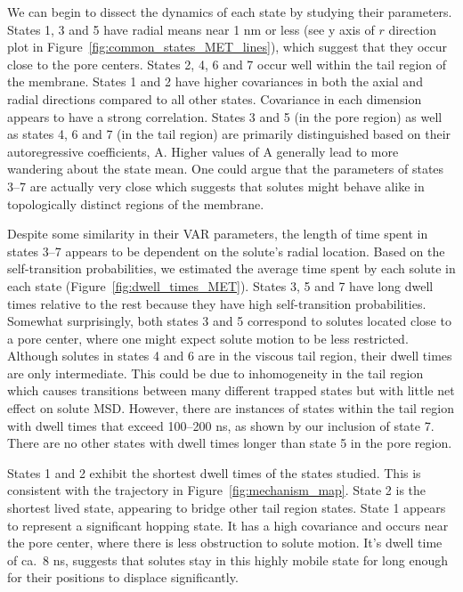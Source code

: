 \documentclass[journal=jpcbfk,manuscript=article]{achemso}
\begin{document}
  We can begin to dissect the dynamics of each state by studying their parameters.
  States 1, 3 and 5 have radial means near 1 nm or less (see y axis of $r$ direction 
  plot in Figure~\ref{fig:common_states_MET_lines}), which suggest that they occur
  close to the pore centers. States 2, 4, 6 and 7 occur well within the tail region
  of the membrane. States 1 and 2 have higher covariances in both the axial and radial
  directions compared to all other states. Covariance in each dimension appears to have
  a strong correlation. States 3 and 5 (in the pore region) as well as states 4, 6 and
  7 (in the tail region) are primarily distinguished based on their autoregressive 
  coefficients, A. Higher values of A generally lead to more wandering about the state
  mean. One could argue that the parameters of states 3--7 are actually very close which
  suggests that solutes might behave alike in topologically distinct regions of the 
  membrane.

  Despite some similarity in their VAR parameters, the length of time spent in states 
  3--7 appears to be dependent on the solute's radial location. Based on the 
  self-transition probabilities, we estimated the average time spent by each solute in
  each state (Figure~\ref{fig:dwell_times_MET}). States 3, 5 and 7 have long dwell times
  relative to the rest because they have high self-transition probabilities. Somewhat 
  surprisingly, both states 3 and 5 correspond to solutes located close to a pore center,
  where one might expect solute motion to be less restricted. Although solutes in states
  4 and 6 are in the viscous tail region, their dwell times are only intermediate. This
  could be due to inhomogeneity in the tail region which causes transitions between many
  different trapped states but with little net effect on solute MSD. However, there are
  instances of states within the tail region with dwell times that exceed 100--200 ns,
  as shown by our inclusion of state 7. There are no other states with dwell times longer
  than state 5 in the pore region.
  
  States 1 and 2 exhibit the shortest dwell times of the states studied. This is 
  consistent with the trajectory in Figure~\ref{fig:mechanism_map}. State 2 is the 
  shortest lived state, appearing to bridge other tail region states. State 1 
  appears to represent a significant hopping state. It has a high covariance and
  occurs near the pore center, where there is less obstruction to solute motion.
  It's dwell time of ca.~8 ns, suggests that solutes stay in this highly mobile 
  state for long enough for their positions to displace significantly.
  
\end{document}
